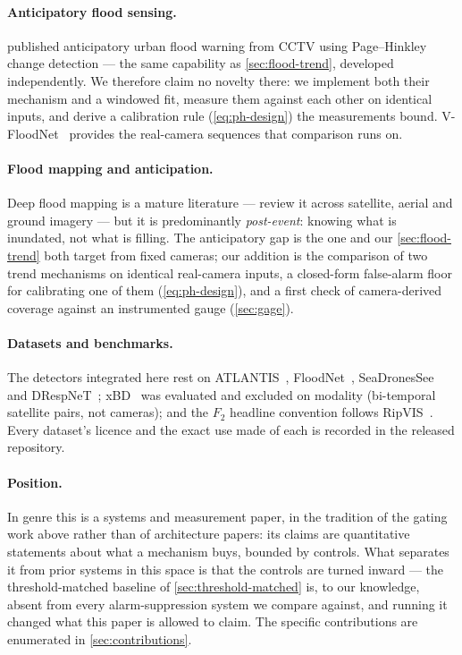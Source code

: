 \paragraph{Anticipatory flood sensing.}
 published anticipatory urban flood warning from
CCTV using Page--Hinkley change detection — the same capability as
\cref{sec:flood-trend}, developed independently. We therefore claim no
novelty there: we implement both their mechanism and a windowed fit, measure
them against each other on identical inputs, and derive a calibration rule
(\cref{eq:ph-design}) the measurements bound. V-FloodNet~\citep{liang2022vfloodnet}
provides the real-camera sequences that comparison runs on.

\paragraph{Flood mapping and anticipation.}
Deep flood mapping is a mature literature — \citet{bentivoglio2022flood}
review it across satellite, aerial and ground imagery — but it is
predominantly \emph{post-event}: knowing what is inundated, not what is
filling. The anticipatory gap is the one \citet{choi2026pagehinkley} and our
\cref{sec:flood-trend} both target from fixed cameras; our addition is the
comparison of two trend mechanisms on identical real-camera inputs, a
closed-form false-alarm floor for calibrating one of them
(\cref{eq:ph-design}), and a first check of camera-derived coverage against
an instrumented gauge (\cref{sec:gage}).

\paragraph{Datasets and benchmarks.} The detectors integrated here rest on
ATLANTIS~\citep{erfani2022atlantis}, FloodNet~\citep{rahnemoonfar2021floodnet},
SeaDronesSee~\citep{varga2022seadronessee} and
DRespNeT~\citep{sirma2025drespnet}; xBD~\citep{gupta2019xbd} was evaluated
and excluded on modality (bi-temporal satellite pairs, not cameras); and the
$F_2$ headline convention follows RipVIS~\citep{ripvis2025}. Every dataset's
licence and the exact use made of each is recorded in the released repository.

\paragraph{Position.} In genre this is a systems and measurement paper, in
the tradition of the gating work above rather than of architecture papers:
its claims are quantitative statements about what a mechanism buys, bounded
by controls. What separates it from prior systems in this space is that the
controls are turned inward — the threshold-matched baseline of
\cref{sec:threshold-matched} is, to our knowledge, absent from every
alarm-suppression system we compare against, and running it changed what
this paper is allowed to claim. The specific contributions are enumerated in
\cref{sec:contributions}.
